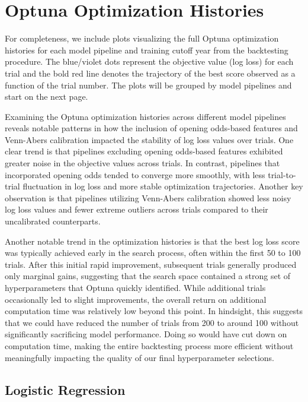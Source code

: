 \documentclass[12pt,twoside]{report}
\begin{document}
\chapter{Optuna Optimization Histories}

For completeness, we include plots visualizing the full Optuna optimization histories for each model pipeline and training cutoff year from the backtesting procedure. The blue/violet dots represent the objective value (log loss) for each trial and the bold red line denotes the trajectory of the best score observed as a function of the trial number. The plots will be grouped by model pipelines and start on the next page.

Examining the Optuna optimization histories across different model pipelines reveals notable patterns in how the inclusion of opening odds-based features and Venn-Abers calibration impacted the stability of log loss values over trials. One clear trend is that pipelines excluding opening odds-based features exhibited greater noise in the objective values across trials. In contrast, pipelines that incorporated opening odds tended to converge more smoothly, with less trial-to-trial fluctuation in log loss and more stable optimization trajectories. Another key observation is that pipelines utilizing Venn-Abers calibration showed less noisy log loss values and fewer extreme outliers across trials compared to their uncalibrated counterparts. 

Another notable trend in the optimization histories is that the best log loss score was typically achieved early in the search process, often within the first 50 to 100 trials. After this initial rapid improvement, subsequent trials generally produced only marginal gains, suggesting that the search space contained a strong set of hyperparameters that Optuna quickly identified. While additional trials occasionally led to slight improvements, the overall return on additional computation time was relatively low beyond this point. In hindsight, this suggests that we could have reduced the number of trials from 200 to around 100 without significantly sacrificing model performance. Doing so would have cut down on computation time, making the entire backtesting process more efficient without meaningfully impacting the quality of our final hyperparameter selections.

\newpage
\section{Logistic Regression}
\end{document}
